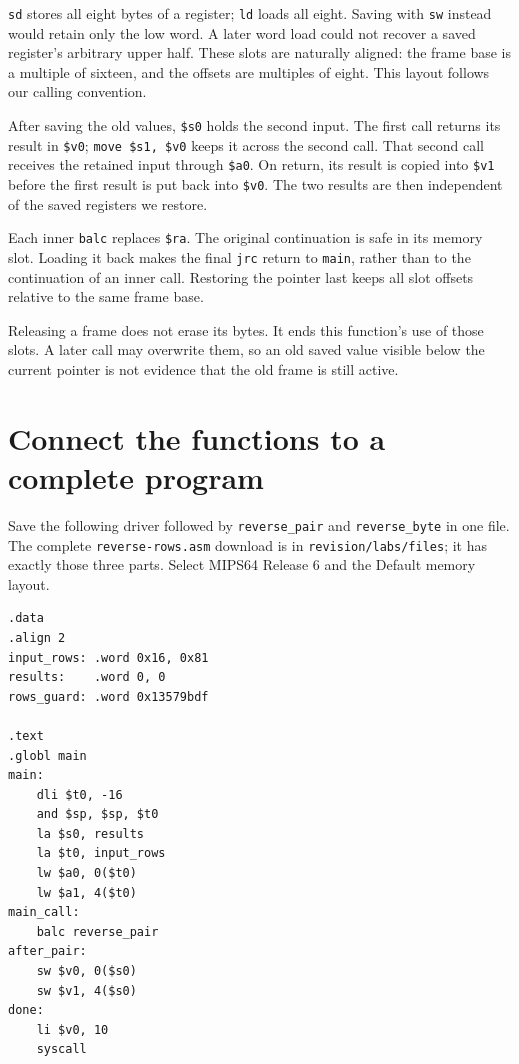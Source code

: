 \texttt{sd} stores all eight bytes of a register; \texttt{ld} loads all eight.
Saving with \texttt{sw} instead would retain only the low word. A later word load
could not recover a saved register's arbitrary upper half. These slots are naturally aligned: the frame base is a multiple of sixteen,
and the offsets are multiples of eight. This layout follows our calling
convention.

After saving the old values, \texttt{\$s0} holds the second input. The first call
returns its result in \texttt{\$v0}; \texttt{move \$s1, \$v0} keeps it across
the second call. That second call receives the retained input through
\texttt{\$a0}. On return, its result is copied into \texttt{\$v1} before the
first result is put back into \texttt{\$v0}. The two results are then independent
of the saved registers we restore.

Each inner \texttt{balc} replaces \texttt{\$ra}. The original continuation is
safe in its memory slot. Loading it back makes the final \texttt{jrc} return to
\texttt{main}, rather than to the continuation of an inner call. Restoring the
pointer last keeps all slot offsets relative to the same frame base.

Releasing a frame does not erase its bytes. It ends this function's use of those
slots. A later call may overwrite them, so an old saved value visible below the
current pointer is not evidence that the old frame is still active.

\section{Connect the functions to a complete program}

Save the following driver followed by \texttt{reverse\_pair} and
\texttt{reverse\_byte} in one file. The complete \texttt{reverse-rows.asm}
download is in \texttt{revision/labs/files}; it has exactly those three parts.
Select MIPS64 Release 6 and the Default memory layout.

\begin{verbatim}
.data
.align 2
input_rows: .word 0x16, 0x81
results:    .word 0, 0
rows_guard: .word 0x13579bdf

.text
.globl main
main:
    dli $t0, -16
    and $sp, $sp, $t0
    la $s0, results
    la $t0, input_rows
    lw $a0, 0($t0)
    lw $a1, 4($t0)
main_call:
    balc reverse_pair
after_pair:
    sw $v0, 0($s0)
    sw $v1, 4($s0)
done:
    li $v0, 10
    syscall
\end{verbatim}

